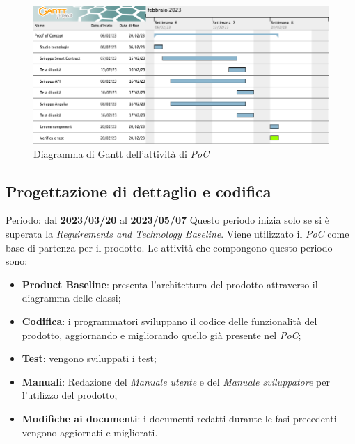 \begin{figure}[H]
    \centering
    \includegraphics[scale=0.4]{src/img/Gantt PoC.png}
    \caption{Diagramma di Gantt dell'attività di \textit{PoC}}
\end{figure}

\subsection{Progettazione di dettaglio e codifica}
Periodo: dal \textbf{2023/03/20} al \textbf{2023/05/07} \newline
Questo periodo inizia solo se si è superata la \textit{Requirements and Technology Baseline}. Viene utilizzato il \textit{PoC}
come base di partenza per il prodotto. Le attività che compongono questo periodo sono:
\begin{itemize}
    \item \textbf{Product Baseline\glo }: presenta l'architettura del prodotto attraverso il diagramma delle classi;
    \item \textbf{Codifica}: i programmatori sviluppano il codice delle funzionalità del prodotto, aggiornando e migliorando quello già presente nel \textit{PoC};
    \item \textbf{Test}: vengono sviluppati i test;
    \item \textbf{Manuali}: Redazione del \textit{Manuale utente} e del \textit{Manuale sviluppatore} per l'utilizzo del prodotto;
    \item \textbf{Modifiche ai documenti}: i documenti redatti durante le fasi precedenti vengono aggiornati e migliorati.
\end{itemize}

